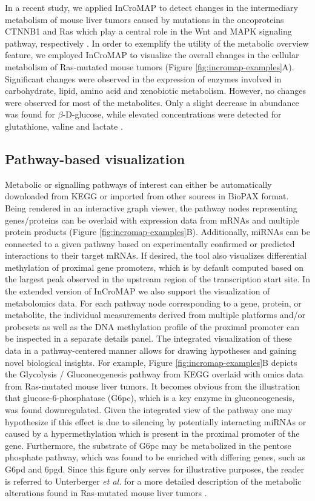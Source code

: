 \documentclass[final,5p,times,twocolumn]{elsarticle}
\newcommand\red[1]{{\color{red}#1}}
\begin{document}
\red{In a recent study, we applied InCroMAP to detect changes in the intermediary metabolism of mouse liver tumors caused by mutations in the oncoproteins CTNNB1 and Ras which play a central role in the Wnt and MAPK signaling pathway, respectively \cite{Unterberger2014}. In order to exemplify the utility of the metabolic overview feature, we employed InCroMAP to visualize the overall changes in the cellular metabolism of Ras-mutated mouse tumors (Figure \ref{fig:incromap-examples}A). Significant changes were observed in the expression of enzymes involved in carbohydrate, lipid, amino acid and xenobiotic metabolism. However, no changes were observed for most of the metabolites. Only a slight decrease in abundance was found for $\beta$-D-glucose, while elevated concentrations were detected for glutathione, valine and lactate \cite{Unterberger2014}.}

\subsection{Pathway-based visualization}
Metabolic or signalling pathways of interest can either be automatically downloaded from KEGG or imported from other sources in BioPAX format. Being rendered in an interactive graph viewer, the pathway nodes representing genes/proteins can be overlaid with expression data from mRNAs and multiple protein products (Figure \ref{fig:incromap-examples}B). Additionally, miRNAs can be connected to a given pathway based on experimentally confirmed or predicted interactions to their target mRNAs. If desired, the tool also visualizes differential methylation of proximal gene promoters, which is by default computed based on the largest peak observed in the upstream region of the transcription start site. In the extended version of InCroMAP we also support the visualization of metabolomics data. For each pathway node corresponding to a gene, protein, or metabolite, the individual measurements derived from multiple platforms and/or probesets as well as the DNA methylation profile of the proximal promoter can be inspected 
in a separate details panel. \red{The integrated visualization of these data in a pathway-centered manner allows for drawing hypotheses and gaining novel biological insights. For example, Figure \ref{fig:incromap-examples}B depicts the Glycolysis / Gluconeogenesis pathway from KEGG overlaid with omics data from Ras-mutated mouse liver tumors. It becomes obvious from the illustration that glucose-6-phosphatase (G6pc), which is a key enzyme in gluconeogenesis, was found downregulated. Given the integrated view of the pathway one may hypothesize if this effect is due to silencing by potentially interacting miRNAs or caused by a hypermethylation which is present in the proximal promoter of the gene. Furthermore, the substrate of G6pc may be metabolized in the pentose phosphate pathway, which was found to be enriched with differing genes, such as G6pd and 6pgd. Since this figure only serves for illustrative purposes, the reader is referred to Unterberger \textit{et al.} for a more detailed description of the 
metabolic alterations found in Ras-mutated mouse liver tumors \cite{Unterberger2014}.}
\end{document}
